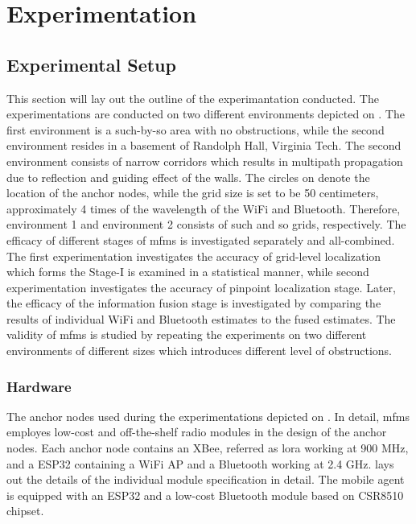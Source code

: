 \section{Experimentation}

    \subsection{Experimental Setup}
    This section will lay out the outline of the experimantation conducted.
    The experimentations are conducted on two different environments depicted on .
    The first environment is a such-by-so area with no obstructions, while the second environment resides in a basement of Randolph Hall, Virginia Tech.
    The second environment consists of narrow corridors which results in multipath propagation due to reflection and guiding effect of the walls.
    The circles on  denote the location of the anchor nodes, while the grid size is set to be 50 centimeters, approximately 4 times of the wavelength of the WiFi and Bluetooth.
    Therefore, environment 1 and environment 2 consists of such and so grids, respectively.
    The efficacy of different stages of \gls{mfms} is investigated separately and all-combined.
    The first experimentation investigates the accuracy of grid-level localization which forms the Stage-I is examined in a statistical manner, while second experimentation investigates the accuracy of pinpoint localization stage.
    Later, the efficacy of the information fusion stage is investigated by comparing the results of individual WiFi and Bluetooth estimates to the fused estimates.
    The validity of \gls{mfms} is studied by repeating the experiments on two different environments of different sizes which introduces different level of obstructions.

    \subsubsection{Hardware}
    The anchor nodes used during the experimentations depicted on .
    In detail, \gls{mfms} employes low-cost and off-the-shelf radio modules in the design of the anchor nodes.
    Each anchor node contains an XBee, referred as \gls{lora} working at 900 MHz, and a ESP32 containing a WiFi \gls{AP} and a Bluetooth working at 2.4 GHz.
     lays out the details of the individual module specification in detail.
    The mobile agent is equipped with an ESP32 and a low-cost Bluetooth module based on CSR8510 chipset.

